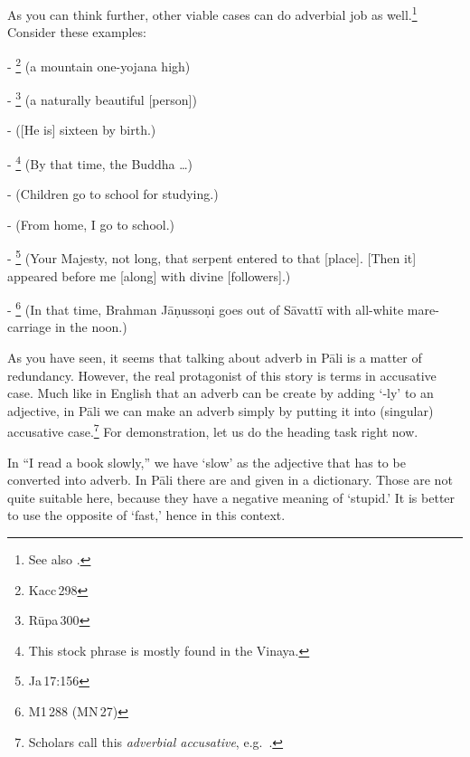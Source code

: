 As you can think further, other viable cases can do adverbial job as well.\footnote{See also \citealp[p.~124]{collins:grammar}.} Consider these examples:\par
- \footnote{Kacc\,298} (a mountain one-yojana high)\par
- \footnote{R\=upa\,300} (a naturally beautiful [person])\par
-  ([He is] sixteen by birth.)\par
- \footnote{This stock phrase is mostly found in the Vinaya.} (By that time, the Buddha \ldots)\par
-  (Children go to school for studying.)\par
-  (From home, I go to school.)\par
- \footnote{Ja\,17:156} (Your Majesty, not long, that serpent entered to that [place]. [Then it] appeared before me [along] with divine [followers].)\par
- \footnote{M1\,288 (MN\,27)} (In that time, Brahman J\=a\d nusso\d ni goes out of S\=avatt\=i with all-white mare-carriage in the noon.)\par

As you have seen, it seems that talking about adverb in P\=ali is a matter of redundancy. However, the real protagonist of this story is terms in accusative case. Much like in English that an adverb can be create by adding `-ly' to an adjective, in P\=ali we can make an adverb simply by putting it into (singular) accusative case.\footnote{Scholars call this \emph{adverbial accusative}, e.g.\ \citealp[p.~116]{warder:intro}.} For demonstration, let us do the heading task right now.

In ``I read a book slowly,'' we have `slow' as the adjective that has to be converted into adverb. In P\=ali there are  and  given in a dictionary. Those are not quite suitable here, because they have a negative meaning of `stupid.' It is better to use the opposite of `fast,' hence  in this context.

